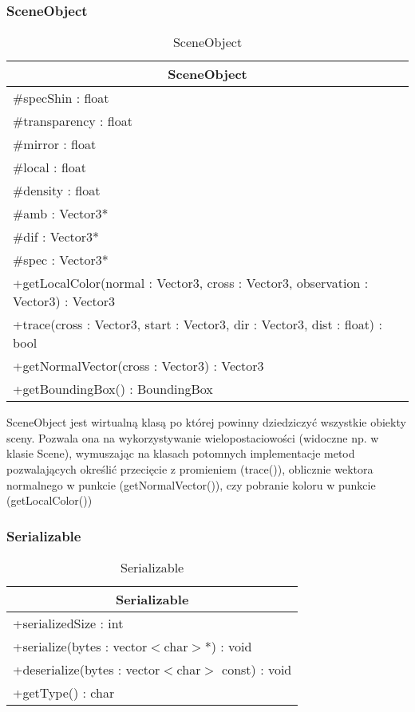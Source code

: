 \subsubsection{SceneObject}

\footnotesize
\begin{longtable}{|p{14cm}|}
    \caption{SceneObject} \label{tab:SceneObject} \\ \hline
    \multicolumn{1}{|c|}{SceneObject} \\ \hline
    \#specShin : float \\
    \#transparency : float \\
    \#mirror : float \\
    \#local : float \\
    \#density : float \\
    \#amb : Vector3* \\
    \#dif : Vector3* \\
    \#spec : Vector3* \\
    \hline
	+getLocalColor(normal : Vector3, cross : Vector3, observation : Vector3) : Vector3 \\
	+trace(cross : Vector3, start : Vector3, dir : Vector3, dist : float) : bool \\
	+getNormalVector(cross : Vector3) : Vector3 \\
	+getBoundingBox() : BoundingBox \\
	\hline
\end{longtable}
\normalsize

SceneObject jest wirtualną klasą po której powinny dziedziczyć wszystkie obiekty sceny. Pozwala ona na wykorzystywanie wielopostaciowości (widoczne np. w klasie Scene), wymuszając na klasach potomnych implementacje metod pozwalających określić przecięcie z promieniem (trace()), oblicznie wektora normalnego w punkcie (getNormalVector()), czy pobranie koloru w punkcie (getLocalColor())

\subsubsection{Serializable}

\footnotesize
\begin{longtable}{|p{14cm}|}
    \caption{Serializable} \label{tab:Serializable} \\ \hline
    \multicolumn{1}{|c|}{Serializable} \\ \hline
    +serializedSize : int \\ \hline
	+serialize(bytes : vector$<$char$>$*) : void \\ 
	+deserialize(bytes : vector$<$char$>$ const) : void \\
	+getType() : char \\
	\hline
\end{longtable}
\normalsize

